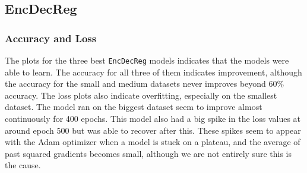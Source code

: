 \newpage
\subsection{EncDecReg}
\subsubsection{Accuracy and Loss}
\newpage
{}

The plots for the three best {\tt EncDecReg} models indicates that the models were able to learn. The accuracy for all three of them indicates improvement, although the accuracy for the small and medium datasets never improves beyond 60\% accuracy. The loss plots also indicate overfitting, especially on the smallest dataset. The model ran on the biggest dataset seem to improve almost continuously for 400 epochs. This model also had a big spike in the loss values at around epoch 500 but was able to recover after this. These spikes seem to appear with the Adam optimizer when a model is stuck on a plateau, and the average of past squared gradients becomes small, although we are not entirely sure this is the cause.

\newpage
